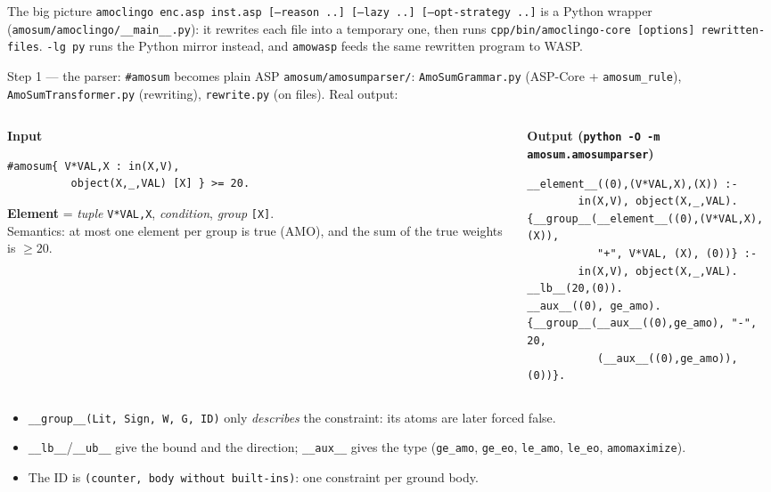 \documentclass[aspectratio=169,11pt]{beamer}
\newcommand{\file}[1]{{\small\texttt{\color{acc}#1}}}
\begin{document}
\begin{frame}{The big picture}
\vspace{4mm}
\footnotesize
\texttt{amoclingo enc.asp inst.asp [--reason ..] [--lazy ..] [--opt-strategy ..]} is a Python wrapper
(\file{amosum/amoclingo/\_\_main\_\_.py}): it rewrites each file into a temporary one, then runs
\file{cpp/bin/amoclingo-core [options] rewritten-files}. \texttt{-lg py} runs the Python mirror instead, and
\texttt{amowasp} feeds the same rewritten program to WASP.
\end{frame}

\begin{frame}[fragile]{Step 1 --- the parser: \texttt{\#amosum} becomes plain ASP}
\footnotesize
\file{amosum/amosumparser/}: \texttt{AmoSumGrammar.py} (ASP-Core + \texttt{amosum\_rule}),
\texttt{AmoSumTransformer.py} (rewriting), \texttt{rewrite.py} (on files). Real output:
\begin{columns}[T]
\begin{column}{.42\textwidth}
\textbf{Input}
\begin{lstlisting}
#amosum{ V*VAL,X : in(X,V),
          object(X,_,VAL) [X] } >= 20.
\end{lstlisting}
\textbf{Element} = \textit{tuple} \texttt{V*VAL,X}, \textit{condition}, \textit{group} \texttt{[X]}.\\[1mm]
Semantics: at most one element per group is true (AMO), and the sum of the true weights is $\ge 20$.
\end{column}
\begin{column}{.56\textwidth}
\textbf{Output (\texttt{python -O -m amosum.amosumparser})}
\begin{lstlisting}
__element__((0),(V*VAL,X),(X)) :-
        in(X,V), object(X,_,VAL).
{__group__(__element__((0),(V*VAL,X),(X)),
           "+", V*VAL, (X), (0))} :-
        in(X,V), object(X,_,VAL).
__lb__(20,(0)).
__aux__((0), ge_amo).
{__group__(__aux__((0),ge_amo), "-", 20,
           (__aux__((0),ge_amo)), (0))}.
\end{lstlisting}
\end{column}
\end{columns}
\vspace{1mm}
\begin{itemize}\setlength\itemsep{0pt}
\item \texttt{\_\_group\_\_(Lit, Sign, W, G, ID)} only \emph{describes} the constraint: its atoms are later forced false.
\item \texttt{\_\_lb\_\_}/\texttt{\_\_ub\_\_} give the bound and the direction; \texttt{\_\_aux\_\_} gives the type
  (\texttt{ge\_amo}, \texttt{ge\_eo}, \texttt{le\_amo}, \texttt{le\_eo}, \texttt{amomaximize}).
\item The ID is \texttt{(counter, body without built-ins)}: one constraint per ground body.
\end{itemize}
\end{frame}
\end{document}

